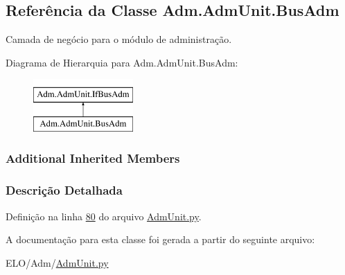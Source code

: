 \hypertarget{classAdm_1_1AdmUnit_1_1BusAdm}{\subsection{Referência da Classe Adm.\-Adm\-Unit.\-Bus\-Adm}
\label{classAdm_1_1AdmUnit_1_1BusAdm}
}


Camada de negócio para o módulo de administração.  


Diagrama de Hierarquia para Adm.\-Adm\-Unit.\-Bus\-Adm\-:\begin{figure}[H]
\begin{center}
\leavevmode
\includegraphics[height=2.000000cm]{de/de0/classAdm_1_1AdmUnit_1_1BusAdm}
\end{center}
\end{figure}
\subsubsection*{Additional Inherited Members}


\subsubsection{Descrição Detalhada}


Definição na linha \hyperlink{AdmUnit_8py_source_l00080}{80} do arquivo \hyperlink{AdmUnit_8py_source}{Adm\-Unit.\-py}.



A documentação para esta classe foi gerada a partir do seguinte arquivo\-:\begin{DoxyCompactItemize}
\item 
E\-L\-O/\-Adm/\hyperlink{AdmUnit_8py}{Adm\-Unit.\-py}\end{DoxyCompactItemize}
